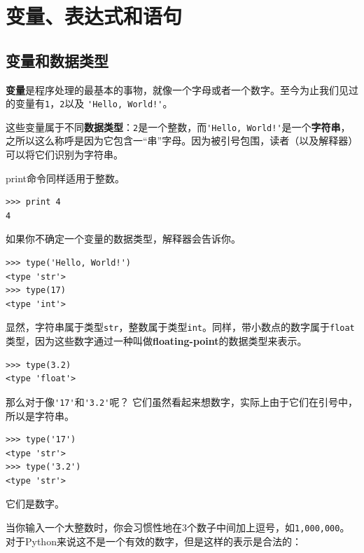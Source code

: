 \chapter{变量、表达式和语句}

\section{变量和数据类型}

{\bf 变量}是程序处理的最基本的事物，就像一个字母或者一个数字。至今为止我们见过的变量有{\tt 1}，{\tt 2}以及
\verb"'Hello, World!'"。

这些变量属于不同{\bf 数据类型}：{\tt 2}是一个整数，而\verb"'Hello, World!'"是一个{\bf 字符串}，之所以这么称呼是因为它包含一“串”字母。因为被引号包围，读者（以及解释器）可以将它们识别为字符串。


print命令同样适用于整数。

\beforeverb
\begin{verbatim}
>>> print 4
4
\end{verbatim}
\afterverb
%
如果你不确定一个变量的数据类型，解释器会告诉你。

\beforeverb
\begin{verbatim}
>>> type('Hello, World!')
<type 'str'>
>>> type(17)
<type 'int'>
\end{verbatim}
\afterverb
%
显然，字符串属于类型{\tt str}，整数属于类型{\tt int}。同样，带小数点的数字属于{\tt float}类型，因为这些数字通过一种叫做{\bf floating-point}的数据类型来表示。


\beforeverb
\begin{verbatim}
>>> type(3.2)
<type 'float'>
\end{verbatim}
\afterverb
%
那么对于像\verb"'17'"和\verb"'3.2'"呢？
它们虽然看起来想数字，实际上由于它们在引号中，所以是字符串。


\beforeverb
\begin{verbatim}
>>> type('17')
<type 'str'>
>>> type('3.2')
<type 'str'>
\end{verbatim}
\afterverb
%
它们是数字。

当你输入一个大整数时，你会习惯性地在3个数子中间加上逗号，如{\tt 1,000,000}。对于Python来说这不是一个有效的数字，但是这样的表示是合法的：

